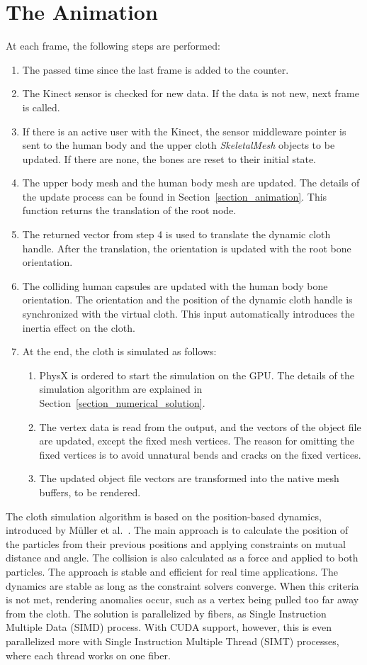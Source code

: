 \section{The Animation}
At each frame, the following steps are performed:
\begin{enumerate}
\item The passed time since the last frame is added to the counter.
\item The Kinect sensor is checked for new data. If the data is not new, next frame is called. 
\item If there is an active user with the Kinect, the sensor middleware pointer is sent to the human body and the upper cloth {\em SkeletalMesh} objects to be updated. If there are none, the bones are reset to their initial state.
\item The upper body mesh and the human body mesh are updated. The details of the update process can be found in Section~\ref{section_animation}. This function returns the translation of the root node. 
\item The returned vector from step 4 is used to translate the dynamic cloth handle. After the translation, the orientation is  updated with the root bone orientation.
\item The colliding human capsules are updated with the human body bone orientation. The orientation and the position of the dynamic cloth handle is synchronized with the virtual cloth. This input automatically introduces the inertia effect on the cloth.
\item At the end, the cloth is simulated as follows:
\begin{enumerate}
\item PhysX is ordered to start the simulation on the GPU. The details of the simulation algorithm are explained in Section~\ref{section_numerical_solution}.
\item The vertex data is read from the output, and the vectors of the object file are updated, except the fixed mesh vertices. The reason for omitting the fixed vertices is to avoid unnatural bends and cracks on the fixed vertices.
  \item The updated object file vectors are transformed into the native mesh buffers, to be rendered. 
\end{enumerate}
\end{enumerate}

The cloth simulation algorithm is based on the position-based dynamics, introduced by M{\"u}ller et al.~\cite{Muller2007}. The main approach is to calculate the position of the particles from their previous positions and applying constraints on mutual distance and angle. The collision is also calculated as a force and applied to both particles. The approach is stable and efficient for real time applications. The dynamics are stable as long as the constraint solvers converge. When this criteria is not met, rendering anomalies occur, such as a vertex being pulled too far away from the cloth. The solution is parallelized by fibers, as Single Instruction Multiple Data (SIMD) process. With CUDA support, however, this is even parallelized more with Single Instruction Multiple Thread (SIMT) processes, where each thread works on one fiber.

